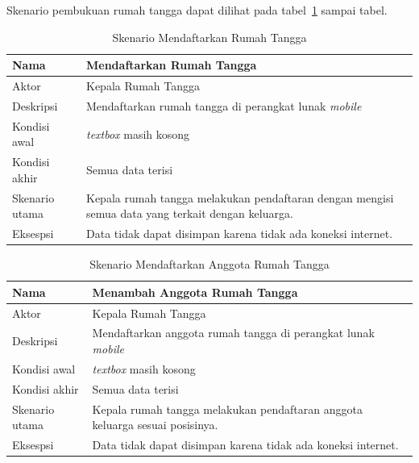 \newpage

Skenario pembukuan rumah tangga dapat dilihat  pada tabel~\ref{tab:mendaftar} sampai tabel.

\begin{table}[H]
	\centering
		\begin{tabular}{ |p{2cm}|p{10cm}| }
			\hline
			Nama &  Mendaftarkan Rumah Tangga\\ \hline
			Aktor & Kepala Rumah Tangga  \\ \hline
			Deskripsi & Mendaftarkan rumah tangga di perangkat lunak \textit{mobile} \\ \hline
			Kondisi awal & \textit{textbox} masih kosong  \\ \hline
			Kondisi akhir & Semua data terisi \\ \hline
			Skenario utama & Kepala rumah tangga melakukan pendaftaran dengan mengisi semua data yang terkait dengan keluarga. \\ \hline
			Eksespsi & Data tidak dapat disimpan karena tidak ada koneksi internet.  \\ 
			\hline
		\end{tabular}
	\caption{Skenario Mendaftarkan Rumah Tangga}
	\label{tab:mendaftar}
\end{table}

\begin{table}[H]
	\centering
		\begin{tabular}{ |p{2cm}|p{10cm}| }
			\hline
			Nama &  Menambah Anggota Rumah Tangga\\ \hline
			Aktor & Kepala Rumah Tangga  \\ \hline
			Deskripsi & Mendaftarkan anggota rumah tangga di perangkat lunak \textit{mobile} \\ \hline
			Kondisi awal & \textit{textbox} masih kosong  \\ \hline
			Kondisi akhir & Semua data terisi \\ \hline
			Skenario utama & Kepala rumah tangga melakukan pendaftaran anggota keluarga sesuai posisinya. \\ \hline
			Eksespsi & Data tidak dapat disimpan karena tidak ada koneksi internet.  \\ 
			\hline
		\end{tabular}
	\caption{Skenario Mendaftarkan Anggota Rumah Tangga}
	\label{tab:mendaftarAnggota}
\end{table}

